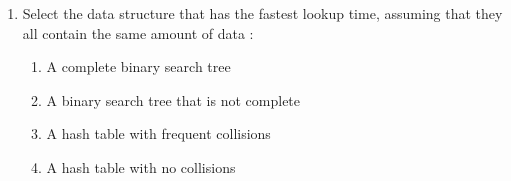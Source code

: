 \documentclass{article}
\begin{document}
\begin{enumerate}
\begin{lstlisting}[language=Java]
		}
	}
	\end{lstlisting}

	\item Select the data structure that has the fastest lookup time,
	assuming that they all contain the same amount of data :
		\begin{enumerate}
			\item A complete binary search tree
			\item A binary search tree that is not complete
			\item A hash table with frequent collisions
			\item A hash table with no collisions
		\end{enumerate}

\end{enumerate}
\end{document}
